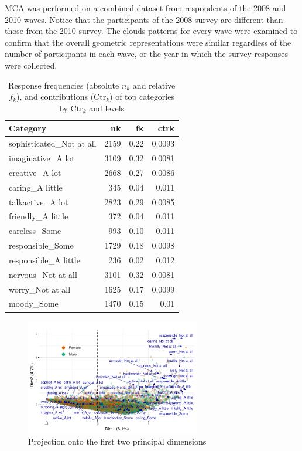 \documentclass[]{article}
\begin{document}
MCA was performed on a combined dataset from respondents of the 2008 and
2010 waves. Notice that the participants of the 2008 survey are
different than those from the 2010 survey. The clouds patterns for every
wave were examined to confirm that the overall geometric representations
were similar regardless of the number of participants in each wave, or
the year in which the survey responses were collected.

\begin{table}[H]
\caption{Response frequencies (absolute $n_k$ and relative $f_k$), and contributions ($\text{Ctr}_k$) of  top categories by $\text{Ctr}_k$ and levels} 
\centering
\begin{tabular}{lrrr}
  \hline
  Category & nk & fk & ctrk \\ 
  \hline
  sophisticated\_Not at all & 2159 & 0.22 & 0.0093 \\ 
  imaginative\_A lot & 3109 & 0.32 & 0.0081 \\ 
  creative\_A lot & 2668 & 0.27 & 0.0086 \\ 
  caring\_A little & 345 & 0.04 & 0.011 \\ 
  talkactive\_A lot & 2823 & 0.29 & 0.0085 \\ 
  friendly\_A little & 372 & 0.04 & 0.011 \\ 
  careless\_Some & 993 & 0.10 & 0.011 \\ 
  responsible\_Some & 1729 & 0.18 & 0.0098 \\ 
  responsible\_A little & 236 & 0.02 & 0.012 \\ 
  nervous\_Not at all & 3101 & 0.32 & 0.0081 \\ 
  worry\_Not at all & 1625 & 0.17 & 0.0099 \\ 
  moody\_Some & 1470 & 0.15 & 0.01 \\ 
   \hline
\end{tabular}
\label{tab:fknkTop12}
\end{table}

\begin{figure}[h!] 
\centering 
\includegraphics[width=3in]{../figs/newbiplot12.pdf}
\caption{Projection onto the first two principal dimensions}
\label{fig:biplot} 
\end{figure}
\end{document}
